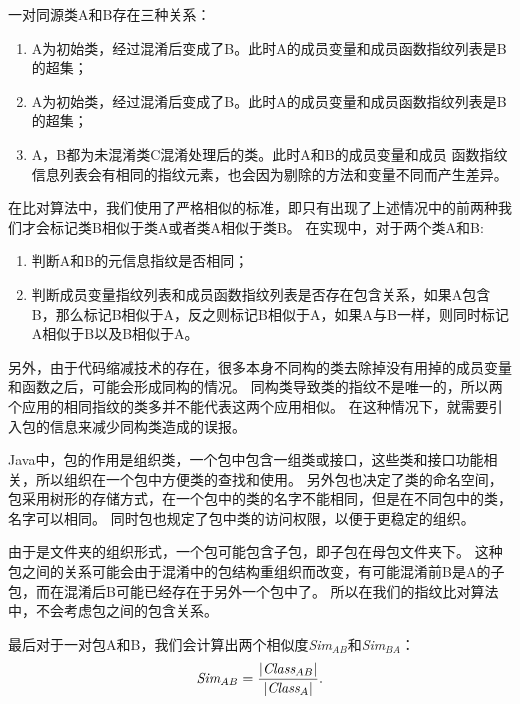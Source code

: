 一对同源类A和B存在三种关系：

\begin{enumerate}
	\item A为初始类，经过混淆后变成了B。此时A的成员变量和成员函数指纹列表是B的超集；
	\item A为初始类，经过混淆后变成了B。此时A的成员变量和成员函数指纹列表是B的超集；
	\item A，B都为未混淆类C混淆处理后的类。此时A和B的成员变量和成员	函数指纹信息列表会有相同的指纹元素，也会因为剔除的方法和变量不同而产生差异。
\end{enumerate}

在比对算法中，我们使用了严格相似的标准，即只有出现了上述情况中的前两种我们才会标记类B相似于类A或者类A相似于类B。
在实现中，对于两个类A和B:

\begin{enumerate}
	\item 判断A和B的元信息指纹是否相同；
	\item 判断成员变量指纹列表和成员函数指纹列表是否存在包含关系，如果A包含B，那么标记B相似于A，反之则标记B相似于A，如果A与B一样，则同时标记A相似于B以及B相似于A。
\end{enumerate}

另外，由于代码缩减技术的存在，很多本身不同构的类去除掉没有用掉的成员变量和函数之后，可能会形成同构的情况。
同构类导致类的指纹不是唯一的，所以两个应用的相同指纹的类多并不能代表这两个应用相似。
在这种情况下，就需要引入包的信息来减少同构类造成的误报。

Java中，包的作用是组织类，一个包中包含一组类或接口，这些类和接口功能相关，所以组织在一个包中方便类的查找和使用。
另外包也决定了类的命名空间，包采用树形的存储方式，在一个包中的类的名字不能相同，但是在不同包中的类，名字可以相同。
同时包也规定了包中类的访问权限，以便于更稳定的组织。

由于是文件夹的组织形式，一个包可能包含子包，即子包在母包文件夹下。
这种包之间的关系可能会由于混淆中的包结构重组织而改变，有可能混淆前B是A的子包，而在混淆后B可能已经存在于另外一个包中了。
所以在我们的指纹比对算法中，不会考虑包之间的包含关系。


最后对于一对包A和B，我们会计算出两个相似度\emph{Sim$_{AB}$}和\emph{Sim$_{BA}$}：
\begin{equation}
	\emph{Sim$_{AB}$} = \frac{|\emph{Class$_{AB}$}|}{|\emph{Class$_{A}$}|}.
\end{equation}


